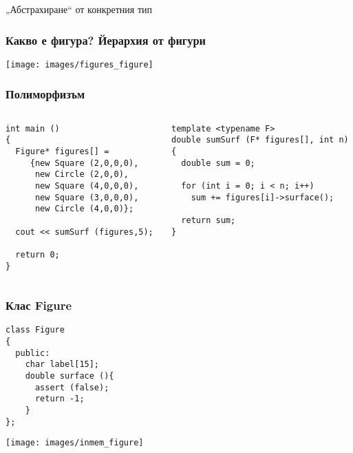\documentclass{beamer}
\begin{document}
\begin{frame}
\centerline{„Абстрахиране“ от конкретния тип}
\end{frame}



\begin{frame}[fragile]
\frametitle{Какво е фигура? Йерархия от фигури}

\begin{center}
\texttt{[image: images/figures\_figure]}
\end{center}

\end{frame}


\begin{frame}[fragile]
\frametitle{Полиморфизъм}


\begin{columns}[t]
  \begin{column}{0.5\textwidth}
\begin{flushleft}
\begin{lstlisting}
int main ()
{
  Figure* figures[] =
     {new Square (2,0,0,0),
      new Circle (2,0,0),
      new Square (4,0,0,0),
      new Square (3,0,0,0),
      new Circle (4,0,0)};

  cout << sumSurf (figures,5);

  return 0;
}
\end{lstlisting}
\end{flushleft}
  \end{column}
  \begin{column}{0.5\textwidth}


\begin{flushleft}
\begin{lstlisting}
template <typename F>
double sumSurf (F* figures[], int n)
{
  double sum = 0;

  for (int i = 0; i < n; i++)
    sum += figures[i]->surface();

  return sum;
}
\end{lstlisting}
\end{flushleft}

  \end{column}
\end{columns}




\end{frame}


\begin{frame}[fragile]
\frametitle{Клас Figure}


\begin{flushleft}
\begin{lstlisting}
class Figure
{
  public:
    char label[15];
    double surface (){
      assert (false);
      return -1;
    }
};
\end{lstlisting}
\end{flushleft}


\begin{center}
\texttt{[image: images/inmem\_figure]}
\end{center}


\end{frame}
\end{document}
